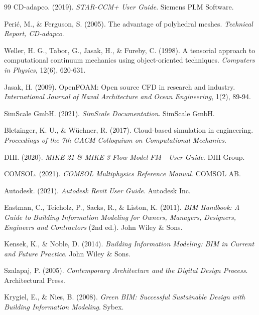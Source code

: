 \begin{thebibliography}{99}
CD-adapco. (2019). \emph{STAR-CCM+ User Guide}. Siemens PLM Software.

Perić, M., \& Ferguson, S. (2005). The advantage of polyhedral meshes. \emph{Technical Report, CD-adapco}.

Weller, H. G., Tabor, G., Jasak, H., \& Fureby, C. (1998). A tensorial approach to computational continuum mechanics using object-oriented techniques. \emph{Computers in Physics}, 12(6), 620-631.

Jasak, H. (2009). OpenFOAM: Open source CFD in research and industry. \emph{International Journal of Naval Architecture and Ocean Engineering}, 1(2), 89-94.

SimScale GmbH. (2021). \emph{SimScale Documentation}. SimScale GmbH.

Bletzinger, K. U., \& Wüchner, R. (2017). Cloud-based simulation in engineering. \emph{Proceedings of the 7th GACM Colloquium on Computational Mechanics}.

DHI. (2020). \emph{MIKE 21 \& MIKE 3 Flow Model FM - User Guide}. DHI Group.

COMSOL. (2021). \emph{COMSOL Multiphysics Reference Manual}. COMSOL AB.

Autodesk. (2021). \emph{Autodesk Revit User Guide}. Autodesk Inc.

Eastman, C., Teicholz, P., Sacks, R., \& Liston, K. (2011). \emph{BIM Handbook: A Guide to Building Information Modeling for Owners, Managers, Designers, Engineers and Contractors} (2nd ed.). John Wiley \& Sons.

Kensek, K., \& Noble, D. (2014). \emph{Building Information Modeling: BIM in Current and Future Practice}. John Wiley \& Sons.

Szalapaj, P. (2005). \emph{Contemporary Architecture and the Digital Design Process}. Architectural Press.

Krygiel, E., \& Nies, B. (2008). \emph{Green BIM: Successful Sustainable Design with Building Information Modeling}. Sybex.

\end{thebibliography}
